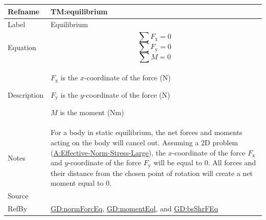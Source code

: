 \documentclass[12pt]{article}
\begin{document}
\medskip
\noindent
\begin{minipage}{\textwidth}
\begin{tabular}{>{\raggedright}p{}>{\raggedright\arraybackslash}p{}}
\toprule \textbf{Refname} & \textbf{TM:equilibrium}
\label{TM:equilibrium}
\\ \midrule
Label & Equilibrium
        
\\ \midrule
Equation & \begin{displaymath}
           \displaystyle\sum{{F_{\text{x}}}}=0
           \end{displaymath}
           \begin{displaymath}
           \displaystyle\sum{{F_{\text{y}}}}=0
           \end{displaymath}
           \begin{displaymath}
           \displaystyle\sum{M}=0
           \end{displaymath}
\\ \midrule
Description & \begin{symbDescription}
              \item{${F_{\text{x}}}$ is the $x$-coordinate of the force (${\text{N}}$)}
              \end{symbDescription}
              \begin{symbDescription}
              \item{${F_{\text{y}}}$ is the $y$-coordinate of the force (${\text{N}}$)}
              \end{symbDescription}
              \begin{symbDescription}
              \item{$M$ is the moment ($\text{N}\text{m}$)}
              \end{symbDescription}
\\ \midrule
Notes & For a body in static equilibrium, the net forces and moments acting on the body will cancel out. Assuming a 2D problem (\hyperref[assumpENSL]{A:Effective-Norm-Stress-Large}), the $x$-coordinate of the force ${F_{\text{x}}}$ and $y$-coordinate of the force ${F_{\text{y}}}$ will be equal to $0$. All forces and their distance from the chosen point of rotation will create a net moment equal to $0$.
        
\\ \midrule
Source & \cite{fredlund1977}
         
\\ \midrule
RefBy & \hyperref[GD:normForcEq]{GD:normForcEq}, \hyperref[GD:momentEql]{GD:momentEql}, and \hyperref[GD:bsShrFEq]{GD:bsShrFEq}
        
\\ \bottomrule
\end{tabular}
\end{minipage}
\end{document}
